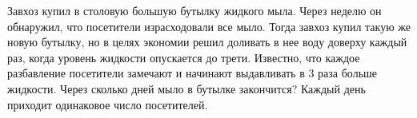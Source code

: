 Завхоз купил в столовую большую бутылку жидкого мыла. Через неделю он обнаружил, что посетители израсходовали все мыло. Тогда завхоз купил такую же новую бутылку, но в целях экономии решил доливать в нее воду доверху каждый раз, когда уровень жидкости опускается до трети. Известно, что каждое разбавление посетители замечают и начинают выдавливать в $3$ раза больше жидкости. Через сколько дней мыло в бутылке закончится?  Каждый день приходит одинаковое число посетителей.